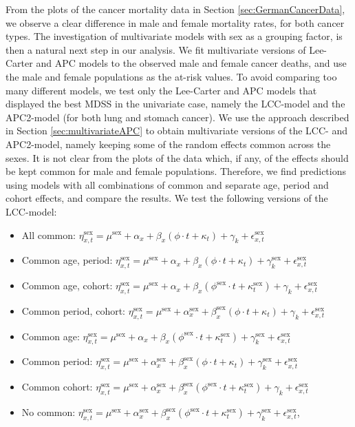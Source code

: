 From the plots of the cancer mortality data in Section \ref{sec:GermanCancerData}, we observe a clear difference in male and female mortality rates, for both cancer types. The investigation of multivariate models with sex as a grouping factor, is then a natural next step in our analysis. We fit multivariate versions of Lee-Carter and APC models to the observed male and female cancer deaths, and use the male and female populations as the at-risk values. To avoid comparing too many different models, we test only the Lee-Carter and APC models that displayed the best MDSS in the univariate case, namely the LCC-model and the APC2-model (for both lung and stomach cancer). We use the approach described in Section \ref{sec:multivariateAPC} to obtain multivariate versions of the LCC- and APC2-model, namely keeping some of the random effects common across the sexes. It is not clear from the plots of the data which, if any, of the effects should be kept common for male and female populations. Therefore, we find predictions using models with all combinations of common and separate age, period and cohort effects, and compare the results. We test the following versions of the LCC-model:
\begin{itemize}
    \item All common: $\eta_{x,t}^{\text{sex}} = \mu^{\text{sex}} + \alpha_x + \beta_x(\phi\cdot t + \kappa_t) + \gamma_k + \epsilon_{x,t}^{\text{sex}}$
    \item Common age, period: $\eta_{x,t}^{\text{sex}} = \mu^{\text{sex}} + \alpha_x + \beta_x(\phi\cdot t + \kappa_t) + \gamma_{k}^{\text{sex}} + \epsilon_{x,t}^{\text{sex}}$
    \item Common age, cohort: $\eta_{x,t}^{\text{sex}} = \mu^{\text{sex}} + \alpha_x + \beta_x(\phi^{\text{sex}}\cdot t + \kappa_{t}^{\text{sex}}) + \gamma_{k} + \epsilon_{x,t}^{\text{sex}}$
    \item Common period, cohort: $\eta_{x,t}^{\text{sex}} = \mu^{\text{sex}} + \alpha_{x}^{\text{sex}} + \beta_{x}^{\text{sex}}(\phi\cdot t + \kappa_t) + \gamma_{k} + \epsilon_{x,t}^{\text{sex}}$
    \item Common age: $\eta_{x,t}^{\text{sex}} = \mu^{\text{sex}} + \alpha_x + \beta_x(\phi^{\text{sex}}\cdot t + \kappa_{t}^{\text{sex}}) + \gamma_{k}^{\text{sex}} + \epsilon_{x,t}^{\text{sex}}$
    \item Common period: $\eta_{x,t}^{\text{sex}} = \mu^{\text{sex}} + \alpha_{x}^{\text{sex}} + \beta_{x}^{\text{sex}}(\phi\cdot t + \kappa_{t}) + \gamma_{k}^{\text{sex}} + \epsilon_{x,t}^{\text{sex}}$
    \item Common cohort: $\eta_{x,t}^{\text{sex}} = \mu^{\text{sex}} + \alpha_{x}^{\text{sex}} + \beta_{x}^{\text{sex}}(\phi^{\text{sex}}\cdot t + \kappa_{t}^{\text{sex}}) + \gamma_{k} + \epsilon_{x,t}^{\text{sex}}$
    \item No common: $\eta_{x,t}^{\text{sex}} = \mu^{\text{sex}} + \alpha_{x}^{\text{sex}} + \beta_{x}^{\text{sex}}(\phi^{\text{sex}}\cdot t + \kappa_{t}^{\text{sex}}) + \gamma_{k}^{\text{sex}} + \epsilon_{x,t}^{\text{sex}}$,
\end{itemize}
